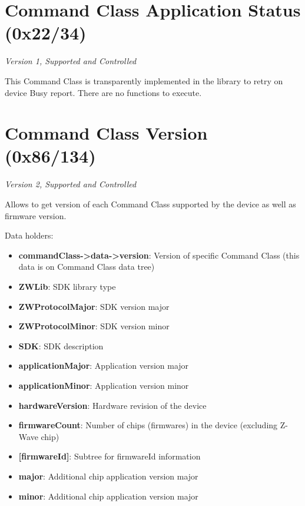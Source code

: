 \section{Command Class Application Status (0x22/34)}

\textit{Version 1, Supported and Controlled}
\newline

This Command Class is transparently implemented in the library to retry on device Busy report. There are no functions to execute.

\section{Command Class Version (0x86/134)}

\textit{Version 2, Supported and Controlled}
\newline

Allows to get version of each Command Class supported by the device as well as firmware version.
\newline

\noindent
Data holders:

\begin{itemize}
\item \textbf{commandClass->data->version}: Version of specific Command Class (this data is on Command Class data tree)
\item \textbf{ZWLib}: SDK library type
\item \textbf{ZWProtocolMajor}: SDK version major
\item \textbf{ZWProtocolMinor}: SDK version minor
\item \textbf{SDK}: SDK description
\item \textbf{applicationMajor}: Application version major
\item \textbf{applicationMinor}: Application version minor
\item \textbf{hardwareVersion}: Hardware revision of the device
\item \textbf{firmwareCount}: Number of chips (firmwares) in the device (excluding Z-Wave chip)
\item \textbf{[firmwareId]}: Subtree for firmwareId information
\item \qquad\textbf{major}: Additional chip application version major
\item \qquad\textbf{minor}: Additional chip application version major
\end{itemize}


